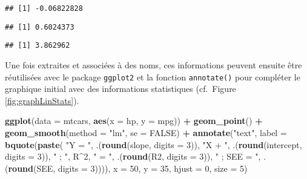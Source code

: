 \documentclass[
  french,
]{book}
\newenvironment{Shaded}{\begin{snugshade}}{\end{snugshade}}
\newcommand{\CommentTok}[1]{\textcolor[rgb]{0.56,0.35,0.01}{\textit{#1}}}
\newcommand{\DataTypeTok}[1]{\textcolor[rgb]{0.13,0.29,0.53}{#1}}
\newcommand{\DecValTok}[1]{\textcolor[rgb]{0.00,0.00,0.81}{#1}}
\newcommand{\KeywordTok}[1]{\textcolor[rgb]{0.13,0.29,0.53}{\textbf{#1}}}
\newcommand{\NormalTok}[1]{#1}
\newcommand{\OperatorTok}[1]{\textcolor[rgb]{0.81,0.36,0.00}{\textbf{#1}}}
\newcommand{\OtherTok}[1]{\textcolor[rgb]{0.56,0.35,0.01}{#1}}
\newcommand{\StringTok}[1]{\textcolor[rgb]{0.31,0.60,0.02}{#1}}
\begin{document}
\begin{verbatim}
## [1] -0.06822828
\end{verbatim}

\begin{Shaded}
\end{Shaded}

\begin{verbatim}
## [1] 0.6024373
\end{verbatim}

\begin{Shaded}
\end{Shaded}

\begin{verbatim}
## [1] 3.862962
\end{verbatim}

Une fois extraites et associées à des noms, ces informations peuvent ensuite être réutilisées avec le package \texttt{ggplot2} et la fonction \texttt{annotate()} pour compléter le graphique initial avec des informations statistiques (cf.~Figure \ref{fig:graphLinStats}).

\begin{Shaded}
\begin{Highlighting}[]
\KeywordTok{ggplot}\NormalTok{(}\DataTypeTok{data =}\NormalTok{ mtcars, }\KeywordTok{aes}\NormalTok{(}\DataTypeTok{x =}\NormalTok{ hp, }\DataTypeTok{y =}\NormalTok{ mpg)) }\OperatorTok{+}
\StringTok{  }\KeywordTok{geom_point}\NormalTok{() }\OperatorTok{+}
\StringTok{  }\KeywordTok{geom_smooth}\NormalTok{(}\DataTypeTok{method =} \StringTok{"lm"}\NormalTok{, }\DataTypeTok{se =} \OtherTok{FALSE}\NormalTok{) }\OperatorTok{+}
\StringTok{  }\KeywordTok{annotate}\NormalTok{(}\StringTok{"text"}\NormalTok{, }\DataTypeTok{label =} \KeywordTok{bquote}\NormalTok{(}\KeywordTok{paste}\NormalTok{(}
    \StringTok{"Y = "}\NormalTok{, .(}\KeywordTok{round}\NormalTok{(slope, }\DataTypeTok{digits =} \DecValTok{3}\NormalTok{)), }\StringTok{"X + "}\NormalTok{, }
\NormalTok{     .(}\KeywordTok{round}\NormalTok{(intercept, }\DataTypeTok{digits =} \DecValTok{3}\NormalTok{)), }\StringTok{" ; "}\NormalTok{,}
\NormalTok{     R}\OperatorTok{^}\DecValTok{2}\NormalTok{, }\StringTok{" = "}\NormalTok{, .(}\KeywordTok{round}\NormalTok{(R2, }\DataTypeTok{digits =} \DecValTok{3}\NormalTok{)), }
     \StringTok{" ; SEE = "}\NormalTok{, .(}\KeywordTok{round}\NormalTok{(SEE, }\DataTypeTok{digits =} \DecValTok{3}\NormalTok{)))), }
           \DataTypeTok{x =} \DecValTok{50}\NormalTok{, }\DataTypeTok{y =} \DecValTok{35}\NormalTok{, }\DataTypeTok{hjust =} \DecValTok{0}\NormalTok{, }\DataTypeTok{size =} \DecValTok{5}\NormalTok{)}
\end{Highlighting}
\end{Shaded}
\end{document}
